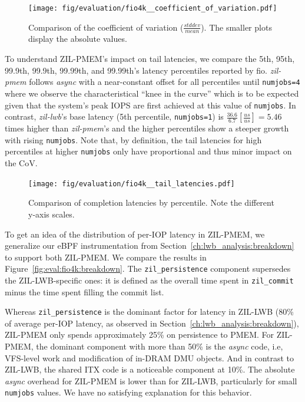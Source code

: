 \documentclass[12pt,a4paper,twoside]{book}
\begin{document}
{\begin{figure}[H]
    \centering
    \texttt{[image: fig/evaluation/fio4k\_\_coefficient\_of\_variation.pdf]}
    \caption{Comparison of the coefficient of variation ($\frac{stddev}{mean}$). The smaller plots display the absolute values.}
    \label{fig:eval:fio4k:cov}
\end{figure}

To understand ZIL-PMEM's impact on tail latencies, we compare the 5th, 95th, 99.9th, 99.9th, 99.99th, and 99.99th's latency percentiles reported by fio.
\textit{zil-pmem} follows \textit{async} with a near-constant offset for all percentiles until \lstinline{numjobs=4} where we observe the characteristical ``knee in the curve'' which is to be expected given that the system's peak IOPS are first achieved at this value of \lstinline{numjobs}.
In contrast, \textit{zil-lwb}'s base latency (5th percentile, \lstinline{numjobs=1}) is $\frac{36.6}{6.7} [\frac{us}{us}] = 5.46$ times higher than \textit{zil-pmem}'s and the higher percentiles show a steeper growth with rising \lstinline{numjobs}.
Note that, by definition, the tail latencies for high percentiles at higher \lstinline{numjobs} only have proportional and thus minor impact on the CoV.

\begin{figure}[H]
    \centering
    \texttt{[image: fig/evaluation/fio4k\_\_tail\_latencies.pdf]}
    \caption{Comparison of completion latencies by percentile. Note the different y-axis scales.}
\end{figure}

To get an idea of the distribution of per-IOP latency in ZIL-PMEM, we generalize our eBPF instrumentation from Section~\ref{ch:lwb_analysis:breakdown} to support both ZIL-PMEM.
We compare the results in Figure~\ref{fig:eval:fio4k:breakdown}.
The \lstinline{zil_persistence} component supersedes the ZIL-LWB-specific ones: it is defined as the overall time spent in \lstinline{zil_commit} minus the time spent filling the commit list.

Whereas \lstinline{zil_persistence} is the dominant factor for latency in ZIL-LWB (80\% of average per-IOP latency, as observed in Section~\ref{ch:lwb_analysis:breakdown}), ZIL-PMEM only spends approximately 25\% on persistence to PMEM.
For ZIL-PMEM, the dominant component with more than 50\% is the \textit{async} code, i.e, VFS-level work and modification of in-DRAM DMU objects.
And in contrast to ZIL-LWB, the shared ITX code is a noticeable component at 10\%.
The absolute \textit{async} overhead for ZIL-PMEM is lower than for ZIL-LWB, particularly for small \lstinline{numjobs} values.
We have no satisfying explanation for this behavior.

}
\end{document}
